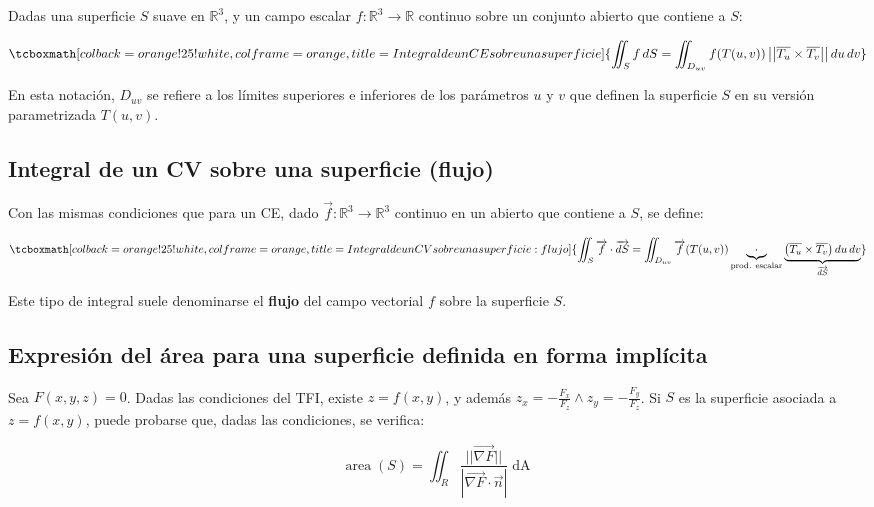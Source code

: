 \documentclass{article}
\renewcommand{\Bbb}{\mathbb}
\begin{document}
Dadas una superficie $S$ suave en $\Bbb R^3$, y un campo escalar $f:\Bbb R^3 \rightarrow \Bbb R$ continuo sobre un conjunto abierto que contiene a $S$:

\begin{equation}
\tcboxmath[colback=orange!25!white,colframe=orange, title=Integral de un CE sobre una superficie]
{ \iint_S f \mathop{dS} = \iint_{D_{uv}} f(T(u,v)) \left|\left| \overline{T_u} \times \overline{T_v} \right|\right| \mathop{du} \mathop{dv} }
\end{equation}

En esta notación, $D_{uv}$ se refiere a los límites superiores e inferiores de los parámetros $u$ y $v$ que definen la superficie $S$ en su versión parametrizada $T(u,v)$.

\subsection{Integral de un CV sobre una superficie (flujo)}

Con las mismas condiciones que para un CE, dado $\overrightarrow{f}:\Bbb R^3 \rightarrow \Bbb R^3$ continuo en un abierto que contiene a $S$, se define:

\begin{equation}
\tcboxmath[colback=orange!25!white,colframe=orange, title=Integral de un CV sobre una superficie: flujo]
{ \iint_S \overrightarrow{f} \cdot \mathop{\overrightarrow{dS}} = \iint_{D_{uv}} \overrightarrow{f}(T(u,v)) \underbrace{\cdot}_{\text{prod. escalar}} \underbrace{ \left( \overline{T_u} \times \overline{T_v} \right) \mathop{du} \mathop{dv}}_{\mathop{\overrightarrow{dS}}} }
\end{equation}

Este tipo de integral suele denominarse el \textbf{flujo} del campo vectorial $f$ sobre la superficie $S$.

\subsection{Expresión del área para una superficie definida en forma implícita}

Sea $F(x,y,z) = 0$. Dadas las condiciones del TFI, existe $z = f(x,y)$, y además $z_x = -\frac{F_x}{F_z} \wedge z_y = -\frac{F_y}{F_z}$. Si $S$ es la superficie asociada a $z = f(x,y)$, puede probarse que, dadas las condiciones, se verifica:

\begin{equation}
\mathop{area}(S) = \iint_{R} \frac{ || \overrightarrow{\nabla F}|| }{ | \overrightarrow{ \nabla F } \cdot \overrightarrow{n} | } \mathop{dA}
\end{equation}
\end{document}
